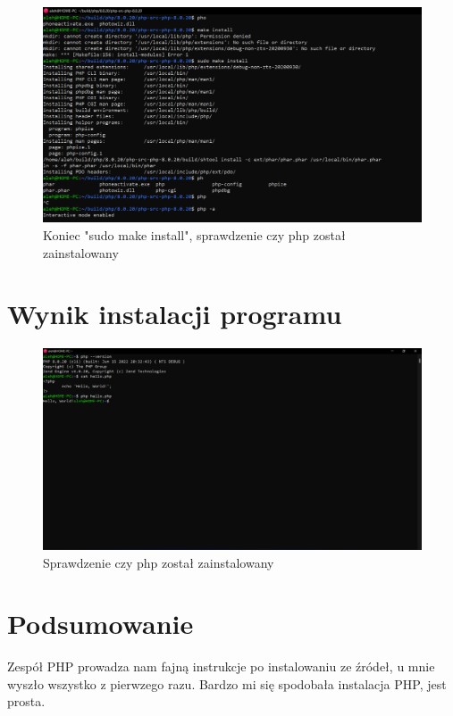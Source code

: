 \documentclass[a4paper,12pt,oneside]{report} %
\begin{document}
\begin{figure}[h]
    \includegraphics[width=16cm]{e12.png}
	\caption{Koniec "sudo make install", sprawdzenie czy php został zainstalowany}
    \label{fig:seventh}
\end{figure}

\chapter{Wynik instalacji programu}

\begin{figure}[h]
    \includegraphics[width=16cm]{workingProgram.png}
	\caption{Sprawdzenie czy php został zainstalowany}
    \label{fig:eight}
\end{figure}

\chapter{Podsumowanie}

Zespół PHP prowadza nam fajną instrukcje po instalowaniu ze źródeł, u mnie wyszło wszystko z pierwzego razu.
Bardzo mi się spodobała instalacja PHP, jest prosta.
\end{document}

